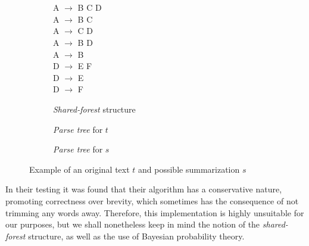 \begin{figure}[H]
\begin{subfigure}{0.3\textwidth}
\quad \\
\quad \\
\phantom{\qquad}A $\rightarrow$ B C D \\
\phantom{\qquad}A $\rightarrow$ B C \\
\phantom{\qquad}A $\rightarrow$ C D \\
\phantom{\qquad}A $\rightarrow$ B D \\
\phantom{\qquad}A $\rightarrow$ B \\
\phantom{\qquad}D $\rightarrow$ E F \\
\phantom{\qquad}D $\rightarrow$ E \\
\phantom{\qquad}D $\rightarrow$ F \\
\caption{\textit{Shared-forest} structure}
\end{subfigure}
\begin{subfigure}{0.4\textwidth}
\centering
{}
\caption{\textit{Parse tree} for $t$}
\end{subfigure}
\begin{subfigure}{0.25\textwidth}
\centering
{}
\caption{\textit{Parse tree} for $s$}
\end{subfigure}
\caption{Example of an original text $t$ and possible summarization $s$}
\label{fig:statistics_example}
\end{figure}

In their testing it was found that their algorithm has a conservative nature, promoting correctness over brevity, which sometimes has the consequence of not trimming any words away. Therefore, this implementation is highly unsuitable for our purposes, but we shall nonetheless keep in mind the notion of the \textit{shared-forest} structure, as well as the use of Bayesian probability theory.


